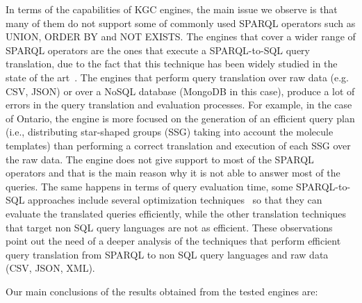In terms of the capabilities of KGC engines, the main issue we observe is that many of them do not support some of commonly used SPARQL operators such as UNION, ORDER BY and NOT EXISTS. The engines that cover a wider range of SPARQL operators are the ones that execute a SPARQL-to-SQL query translation, due to the fact that this technique has been widely studied in the state of the art~\citep{priyatna2014formalisation,calvanese2017ontop}. The engines that perform query translation over raw data (e.g. CSV, JSON) or over a NoSQL database (MongoDB in this case), produce a lot of errors in the query translation and evaluation processes. For example, in the case of Ontario, the engine is more focused on the generation of an efficient query plan (i.e., distributing star-shaped groups (SSG) taking into account the molecule templates) than performing a correct translation and execution of each SSG over the raw data. The engine does not give support to most of the SPARQL operators and that  is the main reason why it is not able to answer most of the queries. The same happens in terms of query evaluation time, some SPARQL-to-SQL approaches include several optimization techniques~\citep{xiao2018efficient} so that they can evaluate the translated queries efficiently, while the other translation techniques that target non SQL query languages are not as efficient. These observations point out the need of a deeper analysis of the techniques that perform efficient query translation from SPARQL to non SQL query languages and raw data (CSV, JSON, XML). 

Our main conclusions of the results obtained from the tested engines are: 

